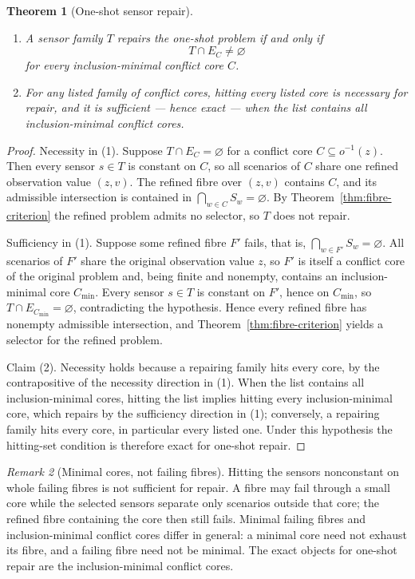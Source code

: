 \documentclass[11pt]{article}
\theoremstyle{plain}
\newtheorem{theorem}{Theorem}[section]
\theoremstyle{definition}
\theoremstyle{remark}
\newtheorem{remark}[theorem]{Remark}
\begin{document}
\begin{theorem}[One-shot sensor repair]
\label{thm:sensor-repair}
\leavevmode
\begin{enumerate}
\item A sensor family \(T\) repairs the one-shot problem if and only if
\[
  T\cap E_C\ne\varnothing
\]
for every inclusion-minimal conflict core \(C\).
\item For any listed family of conflict cores, hitting every listed core is
necessary for repair, and it is sufficient --- hence exact --- when the list
contains all inclusion-minimal conflict cores.
\end{enumerate}
\end{theorem}

\begin{proof}
Necessity in (1).  Suppose \(T\cap E_C=\varnothing\) for a conflict core
\(C\subseteq o^{-1}(z)\).  Then every sensor \(s\in T\) is constant on
\(C\), so all scenarios of \(C\) share one refined observation value
\((z,v)\).  The refined fibre over \((z,v)\) contains \(C\), and its
admissible intersection is contained in \(\bigcap_{w\in C}S_w=\varnothing\).
By Theorem~\ref{thm:fibre-criterion} the refined problem admits no selector,
so \(T\) does not repair.

Sufficiency in (1).  Suppose some refined fibre \(F'\) fails, that is,
\(\bigcap_{w\in F'}S_w=\varnothing\).  All scenarios of \(F'\) share the
original observation value \(z\), so \(F'\) is itself a conflict core of
the original problem and, being finite and nonempty, contains an
inclusion-minimal core \(C_{\min}\).  Every sensor \(s\in T\) is constant
on \(F'\), hence on \(C_{\min}\), so \(T\cap E_{C_{\min}}=\varnothing\),
contradicting the hypothesis.  Hence every refined fibre has nonempty
admissible intersection, and Theorem~\ref{thm:fibre-criterion} yields a
selector for the refined problem.

Claim (2).  Necessity holds because a repairing family hits every core, by
the contrapositive of the necessity direction in (1).  When the list
contains all inclusion-minimal cores, hitting the list implies hitting every
inclusion-minimal core, which repairs by the sufficiency direction in (1);
conversely, a repairing family hits every core, in particular every listed
one.  Under this hypothesis the hitting-set condition is therefore exact for
one-shot repair.
\end{proof}

\begin{remark}[Minimal cores, not failing fibres]
\label{rem:cores-vs-fibres}
Hitting the sensors nonconstant on whole failing fibres is not sufficient for
repair.  A fibre may fail through a small core while the selected sensors
separate only scenarios outside that core; the refined fibre containing the
core then still fails.  Minimal failing fibres and inclusion-minimal conflict
cores differ in general: a minimal core need not exhaust its fibre, and a
failing fibre need not be minimal.  The exact objects for one-shot repair are
the inclusion-minimal conflict cores.
\end{remark}
\end{document}
